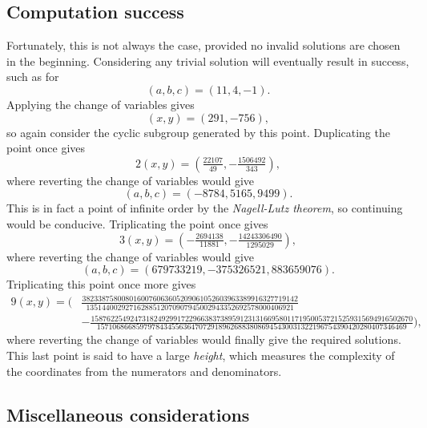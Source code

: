 \documentclass{article}
\newcommand{\rb}[1]{\left( #1 \right)}
\begin{document}
\subsection{Computation success}

Fortunately, this is not always the case, provided no invalid solutions are chosen in the beginning. Considering any trivial solution will eventually result in success, such as for
$$ \rb{a, b, c} = \rb{11, 4, -1}. $$
Applying the change of variables gives
$$ \rb{x, y} = \rb{291, -756}, $$
so again consider the cyclic subgroup generated by this point. Duplicating the point once gives
$$ 2\rb{x, y} = \rb{\tfrac{22107}{49}, -\tfrac{1506492}{343}}, $$
where reverting the change of variables would give
$$ \rb{a, b, c} = \rb{-8784, 5165, 9499}. $$
This is in fact a point of infinite order by the \emph{Nagell-Lutz theorem}, so continuing would be conducive. Triplicating the point once gives
$$ 3\rb{x, y} = \rb{-\tfrac{2694138}{11881}, -\tfrac{14243306490}{1295029}}, $$
where reverting the change of variables would give
$$ \rb{a, b, c} = \rb{679733219, -375326521, 883659076}. $$
Triplicating this point once more gives
\begin{align*}
9\rb{x, y} = (& \tfrac{3823387580080160076063605209061052603963389916327719142}{13514400292716288512070907945002943352692578000406921} \\
& -\tfrac{1587622549247318249299172296638373895912313166958011719500537215259315694916502670}{1571068668597978434556364707291896268838086945430031322196754390420280407346469}),
\end{align*}
where reverting the change of variables would finally give the required solutions. This last point is said to have a large \emph{height}, which measures the complexity of the coordinates from the numerators and denominators.

\subsection{Miscellaneous considerations}
\end{document}

